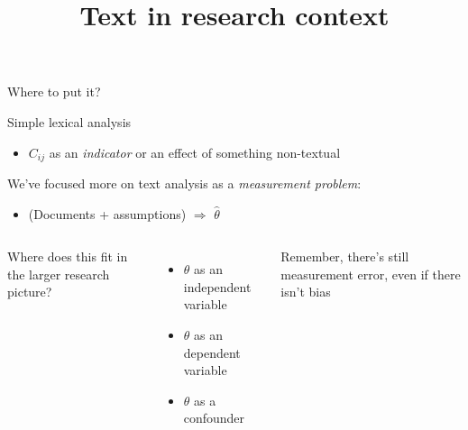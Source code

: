 \documentclass{hertieteaching}
\title{Text in research context}
\begin{document}
\maketitle

\begin{frame}{Where to put it?}

Simple lexical analysis
\begin{itemize}
  \item $C_\mathit{ij}$ as an \textit{indicator} or an effect of something non-textual
\end{itemize}
\pause

We've focused more on text analysis as a \textit{measurement problem}:
\begin{itemize}
  \item (Documents + assumptions) $\Longrightarrow$ $\hat{\theta}$
\end{itemize}

\begin{columns}[T,onlytextwidth]

Where does this fit in the larger research picture?
\begin{itemize}
  \item $\theta$ as an independent variable
  \item $\theta$ as an dependent variable
  \item $\theta$ as a confounder
\end{itemize}

\pause
Remember, there's still measurement error, even if there isn't bias



\end{columns}


\end{frame}
\end{document}
